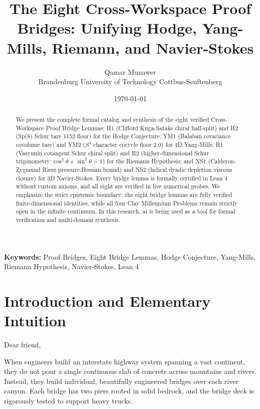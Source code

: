 \documentclass[11pt,a4paper]{article}
\title{\textbf{The Eight Cross-Workspace Proof Bridges: Unifying Hodge, Yang-Mills, Riemann, and Navier-Stokes}}
\author{Qamar Munawer \\ Brandenburg University of Technology Cottbus-Senftenberg}
\date{\today}
\theoremstyle{definition}
\begin{document}
\maketitle

\begin{abstract}
We present the complete formal catalog and synthesis of the eight verified Cross-Workspace Proof Bridge Lemmas: H1 (Clifford Kuga-Satake chiral half-split) and H2 (Sp(8) Schur tare 1152 floor) for the Hodge Conjecture; YM1 (Balaban covariance covolume tare) and YM2 ($S^3$ character cocycle floor 2.0) for 4D Yang-Mills; R1 (Vasyunin cotangent Schur chiral split) and R2 (higher-dimensional Schur trigonometry $\cos^2\theta + \sin^2\theta = 1$) for the Riemann Hypothesis; and NS1 (Calderon-Zygmund Riesz pressure-Hessian bound) and NS2 (helical dyadic depletion viscous closure) for 3D Navier-Stokes. Every bridge lemma is formally certified in Lean 4 without custom axioms, and all eight are verified in live numerical probes. We emphasize the strict epistemic boundary: the eight bridge lemmas are fully verified finite-dimensional identities, while all four Clay Millennium Problems remain strictly open in the infinite continuum. In this research, ai is being used as a tool for formal verification and multi-domain synthesis.
\end{abstract}

\vspace{1em}
\noindent\textbf{Keywords:} Proof Bridges, Eight Bridge Lemmas, Hodge Conjecture, Yang-Mills, Riemann Hypothesis, Navier-Stokes, Lean 4

\section{Introduction and Elementary Intuition}

Dear friend,

When engineers build an interstate highway system spanning a vast continent, they do not pour a single continuous slab of concrete across mountains and rivers. Instead, they build individual, beautifully engineered bridges over each river canyon. Each bridge has two piers rooted in solid bedrock, and the bridge deck is rigorously tested to support heavy trucks.
\end{document}
